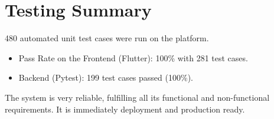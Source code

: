 
\section{Testing Summary}

480 automated unit test cases were run on the platform.

\begin{itemize}
    \item Pass Rate on the Frontend (Flutter): 100\% with 281 test cases.
    \item Backend (Pytest): 199 test cases passed (100\%).
\end{itemize}

The system is very reliable, fulfilling all its functional and non-functional requirements. It is immediately deployment and production ready.

